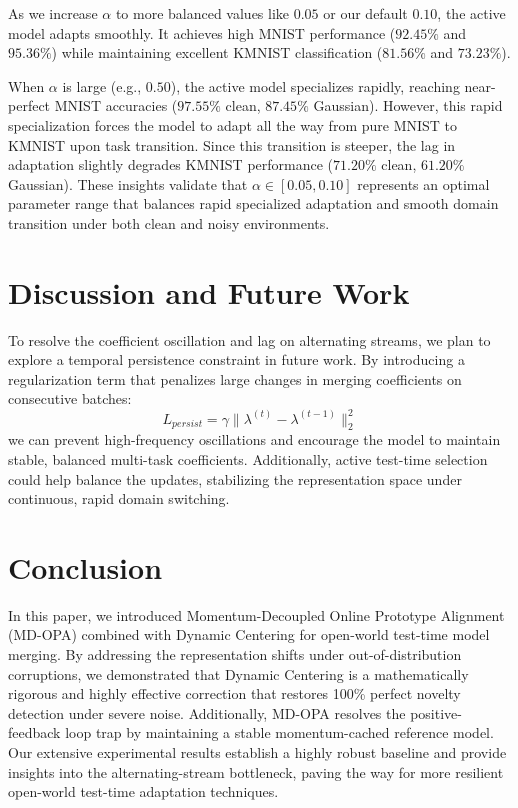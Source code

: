 \documentclass{article}
\theoremstyle{plain}
\theoremstyle{definition}
\theoremstyle{remark}
\begin{document}
As we increase $\alpha$ to more balanced values like $0.05$ or our default $0.10$, the active model adapts smoothly. It achieves high MNIST performance ($92.45\%$ and $95.36\%$) while maintaining excellent KMNIST classification ($81.56\%$ and $73.23\%$). 

When $\alpha$ is large (e.g., $0.50$), the active model specializes rapidly, reaching near-perfect MNIST accuracies ($97.55\%$ clean, $87.45\%$ Gaussian). However, this rapid specialization forces the model to adapt all the way from pure MNIST to KMNIST upon task transition. Since this transition is steeper, the lag in adaptation slightly degrades KMNIST performance ($71.20\%$ clean, $61.20\%$ Gaussian). These insights validate that $\alpha \in [0.05, 0.10]$ represents an optimal parameter range that balances rapid specialized adaptation and smooth domain transition under both clean and noisy environments.

\section{Discussion and Future Work}
To resolve the coefficient oscillation and lag on alternating streams, we plan to explore a temporal persistence constraint in future work. By introducing a regularization term that penalizes large changes in merging coefficients on consecutive batches:
\begin{equation}
    L_{persist} = \gamma \|\lambda^{(t)} - \lambda^{(t-1)}\|_2^2
\end{equation}
we can prevent high-frequency oscillations and encourage the model to maintain stable, balanced multi-task coefficients. Additionally, active test-time selection could help balance the updates, stabilizing the representation space under continuous, rapid domain switching.

\section{Conclusion}
In this paper, we introduced Momentum-Decoupled Online Prototype Alignment (MD-OPA) combined with Dynamic Centering for open-world test-time model merging. By addressing the representation shifts under out-of-distribution corruptions, we demonstrated that Dynamic Centering is a mathematically rigorous and highly effective correction that restores 100\% perfect novelty detection under severe noise. Additionally, MD-OPA resolves the positive-feedback loop trap by maintaining a stable momentum-cached reference model. Our extensive experimental results establish a highly robust baseline and provide insights into the alternating-stream bottleneck, paving the way for more resilient open-world test-time adaptation techniques.
\end{document}
